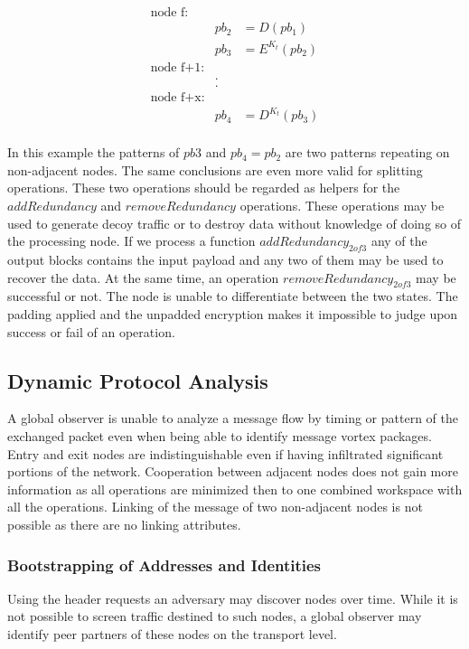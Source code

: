 \documentclass[10pt,journal,compsoc]{IEEEtran}
\begin{document}
\begin{eqnarray*}
	\text{node f:}\\
	& pb_2 & = D(pb_1)\\
	& pb_3 & = E^{K_t}(pb_2)\\
	\text{node f+1:}\\
	&.\\
	&.\\    
	\text{node f+x:}\\
	& pb_4 & = D^{K_t}(pb_3)\\
\end{eqnarray*}

In this example the patterns of $pb3$ and $pb_4=pb_2$ are two patterns repeating on non-adjacent nodes. The same conclusions are even more valid for splitting operations. These two operations should be regarded as helpers for the $addRedundancy$ and $removeRedundancy$ operations. These operations may be used to generate decoy traffic or to destroy data without knowledge of doing so of the processing node. If we process a function $addRedundancy_{2 of 3}$ any of the output blocks contains the input payload and any two of them may be used to recover the data. At the same time, an operation $removeRedundancy_{2 of 3}$ may be successful or not. The node is unable to differentiate between the two states. The padding applied and the unpadded encryption makes it impossible to judge upon success or fail of an operation.

\subsection{Dynamic Protocol Analysis\label{sec:dynamicAnalysis}}
A global observer is unable to analyze a message flow by timing or pattern of the exchanged packet even when being able to identify message vortex packages. Entry and exit nodes are indistinguishable even if having infiltrated significant portions of the network. Cooperation between adjacent nodes does not gain more information as all operations are minimized then to one combined workspace with all the operations. Linking of the message of two non-adjacent nodes is not possible as there are no linking attributes.

\subsubsection{Bootstrapping of Addresses and Identities}
Using the header requests an adversary may discover nodes over time. While it is not possible to screen traffic destined to such nodes, a global observer may identify peer partners of these nodes on the transport level.
\end{document}
